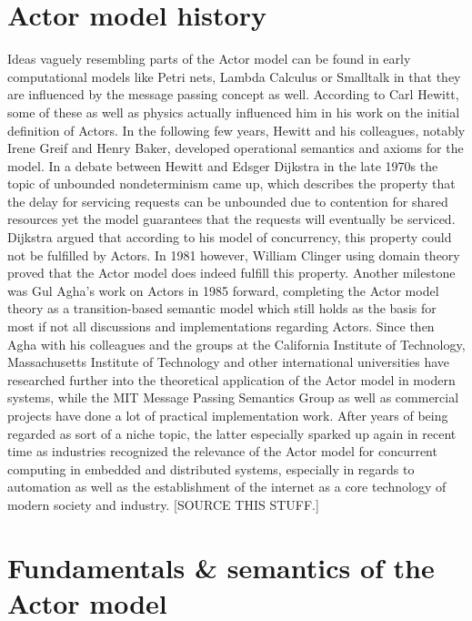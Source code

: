 \documentclass[A4]{article}
\begin{document}
\section{Actor model history}
Ideas vaguely resembling parts of the Actor model can be found in early computational models like Petri nets, Lambda Calculus or Smalltalk in that they are influenced by the message passing concept as well. According to Carl Hewitt, some of these as well as physics actually influenced him in his work on the initial definition of Actors. In the following few years, Hewitt and his colleagues, notably Irene Greif and Henry Baker, developed operational semantics and axioms for the model. In a debate between Hewitt and Edsger Dijkstra in the late 1970s the topic of unbounded nondeterminism came up, which describes the property that the delay for servicing requests can be unbounded due to contention for shared resources yet the model guarantees that the requests will eventually be serviced. Dijkstra argued that according to his model of concurrency, this property could not be fulfilled by Actors. In 1981 however, William Clinger using domain theory proved that the Actor model does indeed fulfill this property. Another milestone was Gul Agha's work on Actors in 1985 forward, completing the Actor model theory as a transition-based semantic model which still holds as the basis for most if not all discussions and implementations regarding Actors. 
Since then Agha with his colleagues and the groups at the California Institute of Technology, Massachusetts Institute of Technology and other international universities have researched further into the theoretical application of the Actor model in modern systems, while the MIT Message Passing Semantics Group as well as commercial projects have done a lot of practical implementation work. After years of being regarded as sort of a niche topic, the latter especially sparked up again in recent time as industries recognized the relevance of the Actor model for concurrent computing in embedded and distributed systems, especially in regards to automation as well as the establishment of the internet as a core technology of modern society and industry. 
[SOURCE THIS STUFF.]

\section{Fundamentals \& semantics of the Actor model}
\end{document}
